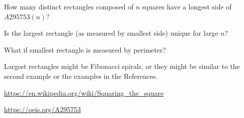 \documentclass{article}
\begin{document}
\begin{question}
  How many distinct rectangles composed of $n$ squares have a longest side of
  $A295753(n)$?
\end{question}
\begin{related}
  \item Is the largest rectangle (as measured by smallest side) unique for large
  $n$?
  \item What if smallest rectangle is measured by perimeter?
\end{related}
\begin{note}
  Largest rectangles might be Fibonacci spirals, or they might be similar to the
  second example or the examples in the References.
\end{note}
\begin{references}
  \item \url{https://en.wikipedia.org/wiki/Squaring_the_square}
  \item \url{https://oeis.org/A295753}
\end{references}
\end{document}
